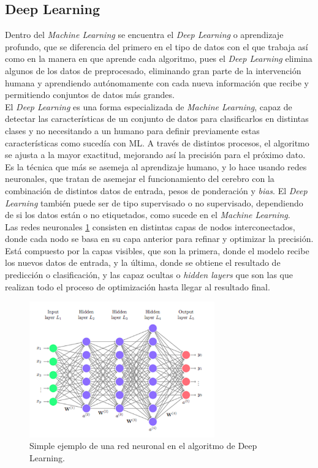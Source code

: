 \subsection{Deep Learning}
Dentro del \textit{Machine Learning} se encuentra el \textit{Deep Learning} o aprendizaje profundo, que se diferencia del primero en el tipo de datos con el que trabaja así como en la manera en que aprende cada algoritmo, pues el \textit{Deep Learning} elimina algunos de los datos de preprocesado, eliminando gran parte de la intervención humana y aprendiendo autónomamente con cada nueva información que recibe y permitiendo conjuntos de datos más grandes.\\
El \textit{Deep Learning} es una forma especializada de \textit{Machine Learning}, capaz  de detectar las características de un conjunto de datos para clasificarlos en distintas clases y no necesitando a un humano para definir previamente estas características como sucedía con ML. A través de distintos procesos, el algoritmo se ajusta a la mayor exactitud, mejorando así la precisión para el próximo dato. Es la técnica que más se asemeja al aprendizaje humano, y lo hace usando redes neuronales, que tratan de asemejar el funcionamiento del cerebro con la combinación de distintos datos de entrada, pesos de ponderación y \textit{bias}. El \textit{Deep Learning} también puede ser de tipo supervisado o no supervisado, dependiendo de si los datos están o no etiquetados, como sucede en el \textit{Machine Learning}.\\
Las redes neuronales \ref{fig:red} consisten en distintas capas de nodos interconectados, donde cada nodo se basa en su capa anterior para refinar y optimizar la precisión. Está compuesto por la capas visibles, que son la primera, donde el modelo recibe los nuevos datos de entrada, y la última, donde se obtiene el resultado de predicción o clasificación, y las capaz ocultas o \textit{hidden layers} que son las que realizan todo el proceso de optimización hasta llegar al resultado final.\\
\begin{figure} [h!]
  \begin{center}
    \includegraphics[width=8cm]{figs/deep_learning}
  \end{center}
  \caption[]{Simple ejemplo de una red neuronal en el algoritmo de Deep Learning. \footnotemark}
  \label{fig:red}
\end{figure}\\

